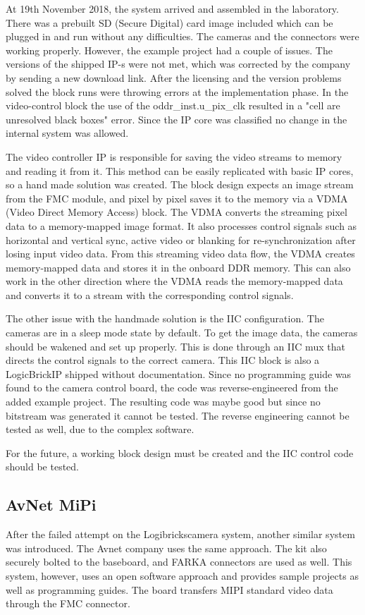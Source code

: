 At 19th November 2018, the system arrived and assembled in the laboratory.
There was a prebuilt SD (Secure Digital) card image included which can be plugged in and run without any difficulties.
The cameras and the connectors were working properly.
However, the example project had a couple of issues.
The versions of the shipped IP-s were not met, which was corrected by the company by sending a new download link.
After the licensing and the version problems solved the block runs were throwing errors at the implementation phase.
In the video-control block the use of the {oddr\_inst.u\_pix\_clk} resulted in a "cell are unresolved black boxes" error.
Since the IP core was classified no change in the internal system was allowed.

The video controller IP is responsible for saving the video streams to memory and reading it from it.
This method can be easily replicated with basic IP cores, so a hand made solution was created.
The block design expects an image stream from the FMC module, and pixel by pixel saves it to the memory via a VDMA (Video Direct Memory Access) block.
The VDMA converts the streaming pixel data to a memory-mapped image format.
It also processes control signals such as horizontal and vertical sync, active video or blanking for re-synchronization after losing input video data.
From this streaming video data flow, the VDMA creates memory-mapped data and stores it in the onboard DDR memory.
This can also work in the other direction where the VDMA reads the memory-mapped data and converts it to a stream with the corresponding control signals.

The other issue with the handmade solution is the IIC configuration.
The cameras are in a sleep mode state by default.
To get the image data, the cameras should be wakened and set up properly.
This is done through an IIC mux that directs the control signals to the correct camera.
This IIC block is also a LogicBrick\texttrademark IP shipped without documentation.
Since no programming guide was found to the camera control board, the code was reverse-engineered from the added example project.
The resulting code was maybe good but since no bitstream was generated it cannot be tested.
The reverse engineering cannot be tested as well, due to the complex software.

For the future, a working block design must be created and the IIC control code should be tested.

\subsection{AvNet MiPi} %
After the failed attempt on the Logibricks\texttrademark camera system, another similar system was introduced. 
The Avnet\texttrademark \cite{avnet_HUG} company uses the same approach.
The kit also securely bolted to the baseboard, and FARKA connectors are used as well.
This system, however, uses an open software approach and provides sample projects as well as programming guides.
The board transfers MIPI standard video data through the FMC connector.

